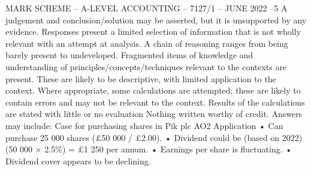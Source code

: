\documentclass{article}
\begin{document}
 \newline
 \newline
 \newline
MARK SCHEME – A-LEVEL ACCOUNTING – 7127/1 – JUNE 2022   –5 \newline
A judgement and conclusion/solution may be asserted, but it is unsupported by any \newline
evidence. \newline
 \newline
Responses present a limited selection of information that is not wholly relevant with \newline
an attempt at analysis.  A chain of reasoning ranges from being barely present to \newline
undeveloped.  \newline
 \newline
Fragmented items of knowledge and understanding of \newline
principles/concepts/techniques relevant to the contexts are present.  These are likely \newline
to be descriptive, with limited application to the context.  Where appropriate, some \newline
calculations are attempted; these are likely to contain errors and may not be relevant \newline
to the context.  Results of the calculations are stated with little or no evaluation   \newline
Nothing written worthy of credit. \newline
 \newline
Answers may include: \newline
 \newline
Case for purchasing shares in Pik plc \newline
 \newline
AO2 Application \newline
• Can purchase 25 000 shares (£50 000 / £2.00). \newline
• Dividend could be (based on 2022) (50 000 × 2.5\%) = £1 250 per annum. \newline
• Earnings per share is fluctuating. \newline
• Dividend cover appears to be declining. \newline
\end{document}
